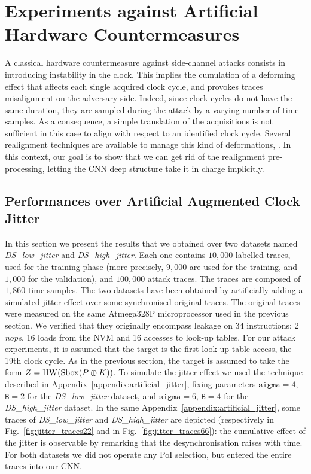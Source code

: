 

\section{Experiments against Artificial Hardware Countermeasures}\label{sec:hard}

A classical hardware countermeasure against side-channel attacks consists in introducing instability in the clock. This implies the cumulation of a deforming effect that affects each single acquired clock cycle, and provokes traces misalignment on the adversary side. Indeed, since clock cycles do not have the same duration, they are sampled during the attack by a varying number of time samples. As a consequence, a simple translation of the acquisitions is not sufficient in this case to align with respect to an identified clock cycle. Several realignment techniques are available to manage this kind of deformations, \eg \cite{van2011improving}. In this context, our goal is to show that  we can get rid of the realignment pre-processing, letting the CNN deep structure take it in charge implicitly. 

\subsection{Performances over Artificial Augmented Clock Jitter}\label{sec:artificial}
In this section we present the results that we obtained over two datasets named \emph{DS\_low\_jitter} and \emph{DS\_high\_jitter}. Each one contains $10,000$ labelled traces, used for the training phase (more precisely, $9,000$ are used for the training, and $1,000$ for the validation), and $100,000$ attack traces. The traces are composed of $1,860$ time samples. The two datasets have been obtained by artificially adding a simulated jitter effect over some synchronised original traces. The original traces were measured on the same Atmega328P microprocessor used in the previous section. We verified that they originally encompass leakage on 34 instructions: 2 \emph{nops}, 16 loads from the NVM and 16 accesses to look-up tables. For our attack experiments, it is assumed that the target is the first look-up table access, \ie the 19th clock cycle. As in the previous section, the target is assumed to take the form $Z=\mathrm{HW}(\mathrm{Sbox}(P\oplus K))$. To simulate the jitter effect we used the technique described in Appendix~\ref{appendix:artificial_jitter}, fixing parameters $\texttt{sigma}=4$, $\texttt{B}=2$ for the \emph{DS\_low\_jitter} dataset,  and $\texttt{sigma}=6$, $\texttt{B}=4$ for the \emph{DS\_high\_jitter} dataset. In the same Appendix~\ref{appendix:artificial_jitter},  some traces of  \emph{DS\_low\_jitter} and  \emph{DS\_high\_jitter} are depicted (respectively in Fig.~\ref{fig:jitter_traces22} and in Fig.~\ref{fig:jitter_traces66}): the cumulative effect of the jitter is observable by remarking that the desynchronisation raises with time. For both datasets we did not operate any PoI selection, but entered the entire traces into our CNN.


